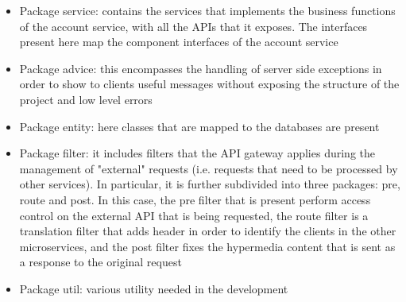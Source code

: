 \begin{itemize}
\item Package service: contains the services that implements the business functions of the account service, with all the APIs that it exposes.
The interfaces present here map the component interfaces of the account service
\item Package advice: this encompasses the handling of server side exceptions in order to show to clients useful messages without exposing
the structure of the project and low level errors
\item Package entity: here classes that are mapped to the databases are present   
\item Package filter: it includes filters that the API gateway applies during the management of "external" requests (i.e. requests that
need to be processed by other services). In particular, it is further subdivided into three packages: pre, route and post. In this case, the
pre filter that is present perform access control on the external API that is being requested, the route filter is a translation filter
that adds header in order to identify the clients in the other microservices, and the post filter fixes the hypermedia content that is sent
as a response to the original request
\item Package util: various utility needed in the development
\end{itemize}

